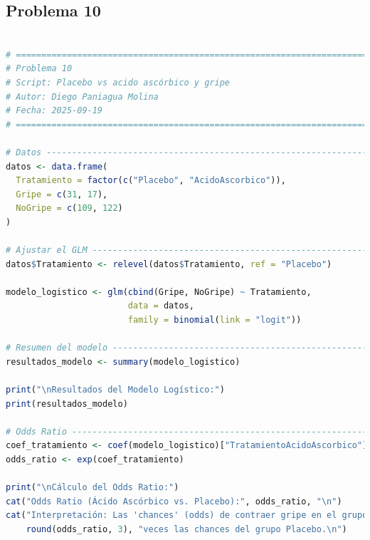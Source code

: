 \clearpage

\subsection{Problema \textcolor{CIMATRed}{10}}

\begin{lstlisting}[language=R, caption={Script: Placebo vs acido ascórbico y gripe.}, label={lst:script8}]

# =============================================================================
# Problema 10
# Script: Placebo vs acido ascórbico y gripe
# Autor: Diego Paniagua Molina
# Fecha: 2025-09-19
# =============================================================================

# Datos -----------------------------------------------------------------------
datos <- data.frame(
  Tratamiento = factor(c("Placebo", "AcidoAscorbico")),
  Gripe = c(31, 17),
  NoGripe = c(109, 122)
)

# Ajustar el GLM --------------------------------------------------------------
datos$Tratamiento <- relevel(datos$Tratamiento, ref = "Placebo")

modelo_logistico <- glm(cbind(Gripe, NoGripe) ~ Tratamiento,
                        data = datos,
                        family = binomial(link = "logit"))

# Resumen del modelo ----------------------------------------------------------
resultados_modelo <- summary(modelo_logistico)

print("\nResultados del Modelo Logístico:")
print(resultados_modelo)

# Odds Ratio ------------------------------------------------------------------
coef_tratamiento <- coef(modelo_logistico)["TratamientoAcidoAscorbico"]
odds_ratio <- exp(coef_tratamiento)

print("\nCálculo del Odds Ratio:")
cat("Odds Ratio (Ácido Ascórbico vs. Placebo):", odds_ratio, "\n")
cat("Interpretación: Las 'chances' (odds) de contraer gripe en el grupo que tomó Ácido Ascórbico son",
    round(odds_ratio, 3), "veces las chances del grupo Placebo.\n")

\end{lstlisting}

\clearpage